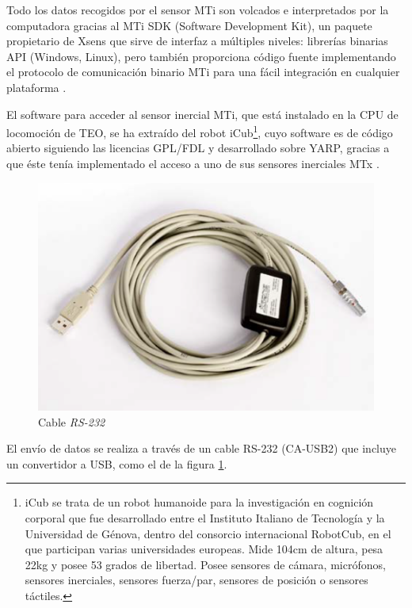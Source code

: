 Todo los datos recogidos por el sensor MTi son volcados e interpretados por la computadora gracias al MTi SDK (Software Development Kit), un paquete propietario de Xsens que sirve de interfaz a múltiples niveles: librerías binarias API%
(Windows, Linux), pero también proporciona código fuente implementando el protocolo de comunicación binario MTi para una fácil integración en cualquier plataforma \cite{ref12}.


El software para acceder al sensor inercial MTi, que está instalado en la CPU de locomoción de TEO, se ha extraído del robot iCub\footnote{iCub se trata de un robot humanoide para la investigación en cognición corporal que fue desarrollado entre el Instituto Italiano de Tecnología y la Universidad de Génova, dentro del consorcio internacional RobotCub, en el que participan varias universidades europeas. Mide 104cm de altura, pesa 22kg y posee 53 grados de libertad. Posee sensores de cámara, micrófonos, sensores inerciales, sensores fuerza/par, sensores de posición o sensores táctiles.}, cuyo software es de código abierto siguiendo las licencias GPL/FDL y desarrollado sobre YARP, gracias a que éste tenía implementado el acceso a uno de sus sensores inerciales MTx \cite{ref32}.

\newpage

\begin{figure}[H]
\centering
\includegraphics[scale=0.6]{imagenes/apartado_3/39_cable_rs_232}
\caption{Cable \textsl{RS-232}}
\label{figura39}
\end{figure}

El envío de datos se realiza a través de un cable RS-232 (CA-USB2) que incluye un convertidor a USB, como el de la figura \ref{figura39}.


\afterpage{\null\newpage}
\newpage